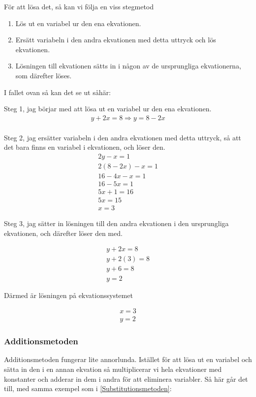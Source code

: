 För att lösa det, så kan vi följa en viss stegmetod

\begin{enumerate}
	\item Lös ut en variabel ur den ena ekvationen.
	\item Ersätt variabeln i den andra ekvationen med detta uttryck och lös ekvationen.
	\item Lösningen till ekvationen sätts in i någon av de ursprungliga ekvationerna, som därefter löses.
\end{enumerate}

I fallet ovan så kan det se ut såhär:

Steg 1, jag börjar med att lösa ut en variabel ur den ena ekvationen.
\begin{align}
	y+2x = 8 \Rightarrow y = 8-2x \\
\end{align}

Steg 2, jag ersätter variabeln i den andra ekvationen med detta uttryck, så att det bara finns en variabel i ekvationen, och löser den.
\begin{align}
	2y-x = 1 \\
	2(8-2x)-x = 1 \\
	16-4x-x = 1 \\
	16-5x = 1 \\
	5x + 1 = 16 \\
	5x = 15 \\
	x = 3
\end{align}

Steg 3, jag sätter in lösningen till den andra ekvationen i den ursprungliga ekvationen, och därefter löser den med.

\begin{align}
	y+2x = 8 \\
	y+2(3) = 8 \\
	y+6 = 8 \\
	y = 2
\end{align}

Därmed är lösningen på ekvationssystemet

\begin{align*}
	x = 3 \\
	y = 2
\end{align*}

\newpage
\subsubsection{Additionsmetoden}

Additionsmetoden fungerar lite annorlunda. Istället för att lösa ut en variabel och sätta in den i en annan ekvation så multiplicerar vi hela ekvationer med konstanter och adderar in dem i andra för att eliminera variabler. Så här går det till, med samma exempel som i \ref{Substitutionsmetoden}:

